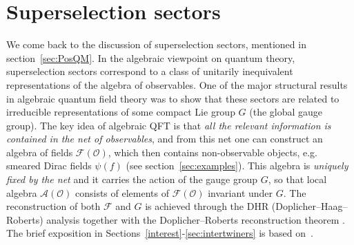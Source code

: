 \documentclass[12pt,a4paper]{article}
\newcommand{\1}{\mathds{1}}                         %
\newcommand{\F}{\mathcal{F}}
\newcommand{\Ocal}{\mathcal{O}}
\newcommand{\Ac}{{\mathcal{A}}}
\newcommand{\Fc}{{\mathcal{F}}}
\begin{document}
 
 




\section{Superselection sectors}\label{sec:sectors}
We come back to the discussion of superselection sectors, mentioned in section~\ref{sec:PosQM}. In the algebraic viewpoint on quantum theory, superselection sectors correspond to a class of unitarily inequivalent representations of the algebra of observables. One of the major structural results in algebraic quantum field theory \cite{DHR1,DHR2,DHR3,DHR4,DR89} was to show that these sectors are related to irreducible representations of some compact Lie group $G$ (the global gauge group). The key idea of algebraic QFT is that \textit{all the relevant information is contained in the net of observables}, and from this net one can construct an algebra of fields $\F(\Ocal)$, which then contains non-observable objects, e.g. smeared Dirac fields $\psi(f)$ (see section~\ref{sec:examples}). This algebra is \textit{uniquely fixed by the net} and it carries the action of the gauge group $G$, so that local algebra $\Ac(\Ocal)$ consists of elements of $\Fc(\Ocal)$ invariant under $G$. The reconstruction of both $\Fc$ and $G$ is achieved through the DHR (Doplicher--Haag--Roberts) analysis \cite{DHR1,DHR2,DHR3,DHR4} together with the Doplicher--Roberts reconstruction theorem \cite{DR89}. The brief exposition in Sections~\ref{interest}-\ref{sec:intertwiners} is based on~\cite{KlausSuperselection}.
\end{document}
